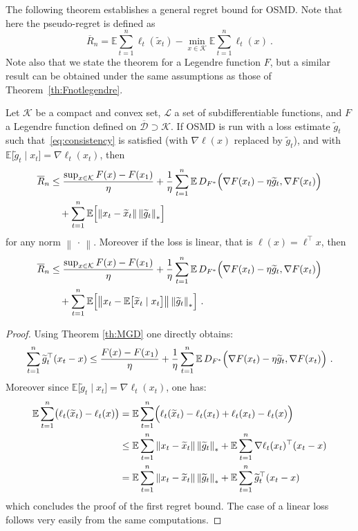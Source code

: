 \documentclass[11pt]{hackednow}
\newcommand{\E}{\mathbb{E}}
\newcommand{\cL}{\mathcal{L}}
\newcommand{\cK}{\mathcal{K}}
\newcommand{\oD}{\overline{\mathcal{D}}}
\newcommand{\oR}{\overline{R}}
\renewcommand{\tilde}{\widetilde}
\newcommand{\norm}[1]{\left\|{#1}\right\|}
\begin{document}
The following theorem establishes a general regret bound for OSMD. Note that here the pseudo-regret is defined as
$$\oR_n = \E \sum_{t=1}^n \ell_t(\tilde{x}_t) - \min_{x \in \cK} \E \sum_{t=1}^n \ell_t(x)~.$$
Note also that we state the theorem for a Legendre function $F$, but a similar result can be obtained under the same assumptions as those of Theorem~\ref{th:Fnotlegendre}.
\begin{theorem} \label{th:OSMD2}
Let $\cK$ be a compact and convex set, $\cL$ a set of subdifferentiable functions, and $F$ a Legendre function defined on $\oD \supset \cK$. If OSMD is run with a loss estimate $\tilde{g}_t$ such that~\eqref{eq:consistency} is satisfied (with $\nabla \ell(x)$ replaced by $\tilde{g}_t$), and with $\E\bigl[\tilde{g}_t \mid x_t\bigr] =\nabla \ell_t(x_t)$, then
\begin{align*}
\oR_n & \leq \frac{\sup_{x \in \cK} F(x) - F(x_1)}{\eta} + \frac{1}{\eta} \sum_{t=1}^n \E\, D_{F^*}\Bigl(\nabla F(x_t) - \eta \tilde{g}_t, \nabla F(x_t)\Bigr) \\
&\quad + \sum_{t=1}^n \E\Bigl[\norm{x_t - \tilde{x}_t}  \norm{\tilde{g}_t}_*\Bigr]
\end{align*}
for any norm $\norm{\,\cdot\,}$.
Moreover if the loss is linear, that is $\ell(x) = \ell^{\top} x$, then
\begin{align*}
\oR_n & \leq \frac{\sup_{x \in \cK} F(x) - F(x_1)}{\eta} + \frac{1}{\eta} \sum_{t=1}^n \E\, D_{F^*}\Bigl(\nabla F(x_t) - \eta \tilde{g}_t, \nabla F(x_t)\Bigr) \\
&\quad + \sum_{t=1}^n \E\Bigl[\norm{x_t - \E\bigl[\tilde{x}_t \mid x_t\bigr]} \norm{\tilde{g}_t}_*\Bigr]~.
\end{align*}
\end{theorem}
\begin{proof}
Using Theorem \ref{th:MGD} one directly obtains:
$$\sum_{t=1}^n \tilde{g}_t^{\top} (x_t - x) \leq \frac{F(x) - F(x_1)}{\eta} + \frac{1}{\eta} \sum_{t=1}^n \E\, D_{F^*} \Bigl(\nabla F(x_t) - \eta \tilde{g}_t, \nabla F(x_t)\Bigr)~.$$
Moreover since $\E\bigl[\tilde{g}_t \mid x_t\bigr] =\nabla \ell_t(x_t)$, one has:
\begin{align*}
\E \sum_{t=1}^n \bigl( \ell_t(\tilde{x}_t) - \ell_t(x) \bigr) & = \E \sum_{t=1}^n \Bigl( \ell_t(\tilde{x}_t) - \ell_t(x_t) + \ell_t(x_t) - \ell_t(x) \Bigr) \\
& \leq \E \sum_{t=1}^n \norm{x_t - \tilde{x}_t} \norm{\tilde{g}_t}_* + \E \sum_{t=1}^n \nabla \ell_t(x_t)^{\top} (x_t - x) \\
& = \E \sum_{t=1}^n \norm{x_t - \tilde{x}_t} \norm{\tilde{g}_t}_* + \E \sum_{t=1}^n \tilde{g}_t^{\top} (x_t - x)
\end{align*}
which concludes the proof of the first regret bound. The case of a linear loss follows very easily from the same computations.
\end{proof}
\end{document}
